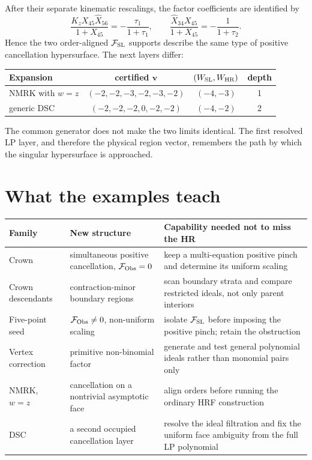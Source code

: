 \documentclass[a4paper,11pt]{article}
\newcommand{\FSL}{\mathcal F_{\rm SL}}
\newcommand{\FObs}{\mathcal F_{\rm Obs}}
\newcommand{\WSL}{W_{\rm SL}}
\newcommand{\WHR}{W_{\rm HR}}
\begin{document}
After their separate kinematic rescalings, the factor coefficients are
identified by
\begin{equation}
 \frac{K_zX_{45}\widehat X_{56}}{1+X_{45}}
 =-\frac{\tau_1}{1+\tau_1},
 \qquad
 \frac{\widehat X_{34}X_{45}}{1+X_{45}}
 =-\frac{1}{1+\tau_2}.
 \label{eq:composite-factor-map}
\end{equation}
Hence the two order-aligned \(\FSL\) supports describe the same type of
positive cancellation hypersurface.  The next layers differ:
\begin{center}
\begin{tabular}{@{}lccc@{}}
\toprule
Expansion & certified \(\boldsymbol v\) & \((\WSL,\WHR)\) & depth\\
\midrule
NMRK with \(w=z\) & \((-2,-2,-3,-2,-3,-2)\) & \((-4,-3)\) & 1\\
generic DSC & \((-2,-2,-2,0,-2,-2)\) & \((-4,-2)\) & 2\\
\bottomrule
\end{tabular}
\end{center}
The common generator does not make the two limits identical.  The first
resolved LP layer, and therefore the physical region vector, remembers the
path by which the singular hypersurface is approached.

\section{What the examples teach}

\begin{center}
\small
\begin{tabular}{@{}>{\raggedright\arraybackslash}p{}
                    >{\raggedright\arraybackslash}p{}
                    >{\raggedright\arraybackslash}p{}@{}}
\toprule
Family & New structure & Capability needed not to miss the HR\\
\midrule
Crown & simultaneous positive cancellation, \(\FObs=0\) & keep a
multi-equation positive pinch and determine its uniform scaling\\
Crown descendants & contraction-minor boundary regions & scan boundary
strata and compare restricted ideals, not only parent interiors\\
Five-point seed & \(\FObs\ne0\), non-uniform scaling & isolate \(\FSL\)
before imposing the positive pinch; retain the obstruction\\
Vertex correction & primitive non-binomial factor & generate and test
general polynomial ideals rather than monomial pairs only\\
NMRK, \(w=z\) & cancellation on a nontrivial asymptotic face & align
orders before running the ordinary HRF construction\\
DSC & a second occupied cancellation layer & resolve the ideal filtration
and fix the uniform face ambiguity from the full LP polynomial\\
\bottomrule
\end{tabular}
\end{center}
\end{document}
